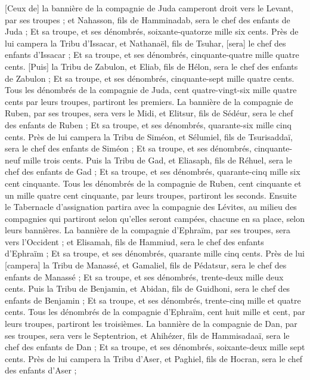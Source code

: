 \begin{multicols}{2}
[Ceux de] la bannière de la compagnie de Juda camperont droit vers le Levant, par ses troupes ; et Nahasson, fils de Hamminadab, sera le chef des enfants de Juda ;
Et sa troupe, et ses dénombrés, soixante-quatorze mille six cents.
Près de lui campera la Tribu d'Issacar, et Nathanaël, fils de Tsuhar, [sera] le chef des enfants d'Issacar ;
Et sa troupe, et ses dénombrés, cinquante-quatre mille quatre cents.
[Puis] la Tribu de Zabulon, et Eliab, fils de Hélon, sera le chef des enfants de Zabulon ;
Et sa troupe, et ses dénombrés, cinquante-sept mille quatre cents.
Tous les dénombrés de la compagnie de Juda, cent quatre-vingt-six mille quatre cents par leurs troupes, partiront les premiers.
La bannière de la compagnie de Ruben, par ses troupes, sera vers le Midi, et Elitsur, fils de Sédéur, sera le chef des enfants de Ruben ;
Et sa troupe, et ses dénombrés, quarante-six mille cinq cents.
Près de lui campera la Tribu de Siméon, et Sélumiel, fils de Tsurisaddaï, sera le chef des enfants de Siméon ;
Et sa troupe, et ses dénombrés, cinquante-neuf mille trois cents.
Puis la Tribu de Gad, et Eliasaph, fils de Réhuel, sera le chef des enfants de Gad ;
Et sa troupe, et ses dénombrés, quarante-cinq mille six cent cinquante.
Tous les dénombrés de la compagnie de Ruben, cent cinquante et un mille quatre cent cinquante, par leurs troupes, partiront les seconds.
Ensuite le Tabernacle d'assignation partira avec la compagnie des Lévites, au milieu des compagnies qui partiront selon qu'elles seront campées, chacune en sa place, selon leurs bannières.
La bannière de la compagnie d'Ephraïm, par ses troupes, sera vers l'Occident ; et Elisamah, fils de Hammiud, sera le chef des enfants d'Ephraïm ;
Et sa troupe, et ses dénombrés, quarante mille cinq cents.
Près de lui [campera] la Tribu de Manassé, et Gamaliel, fils de Pédatsur, sera le chef des enfants de Manassé ;
Et sa troupe, et ses dénombrés, trente-deux mille deux cents.
Puis la Tribu de Benjamin, et Abidan, fils de Guidhoni, sera le chef des enfants de Benjamin ;
Et sa troupe, et ses dénombrés, trente-cinq mille et quatre cents.
Tous les dénombrés de la compagnie d'Ephraïm, cent huit mille et cent, par leurs troupes, partiront les troisièmes.
La bannière de la compagnie de Dan, par ses troupes, sera vers le Septentrion, et Ahihézer, fils de Hammisadaaï, sera le chef des enfants de Dan ;
Et sa troupe, et ses dénombrés, soixante-deux mille sept cents.
Près de lui campera la Tribu d'Aser, et Paghiel, fils de Hocran, sera le chef des enfants d'Aser ;

\end{multicols}
